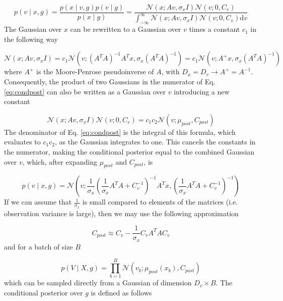\documentclass{paper}
\begin{document}
\begin{equation} \label{eq:condpost}
p(v \mid x,g) = \frac{p(x \mid v,g) p(v \mid g)}{p(x \mid g)} = \frac{\mathcal{N}(x;Av,\sigma_x I) \mathcal{N}(v;0,C_v)}{\int_{-\infty}^{\infty} \mathcal{N}(x;Av,\sigma_x I) \mathcal{N}(v;0,C_v) \mathrm{d}v}
\end{equation}
%
The Gaussian over $x$ can be rewritten to a Gaussian over $v$ times a constant $c_1$ in the following way

\begin{equation} \label{eq:gauss_rewrite1}
\mathcal{N}(x;Av,\sigma_x I) = c_1 \mathcal{N}(v; (A^T A)^{-1} A^T x, \sigma_x (A^T A)^{-1}) = c_1 \mathcal{N}(v; A^{+} x, \sigma_x (A^T A)^{-1})
\end{equation}
%
where $A^{+}$ is the Moore-Penrose pseudoinverse of $A$, with $D_x = D_v \rightarrow A^{+} = A^{-1}$. Consequently, the product of two Gaussians in the numerator of Eq. \ref{eq:condpost} can also be written as a Gaussian over $v$ introducing a new constant

\begin{equation} \label{eq:gauss_rewrite2}
\mathcal{N}(x;Av,\sigma_x I) \mathcal{N}(v;0,C_v) = c_1 c_2 \mathcal{N}(v; \mu_{post},C_{post})
\end{equation}
%
The denominator of Eq. \ref{eq:condpost} is the integral of this formula, which evaluates to $c_1c_2$, as the Gaussian integrates to one. This cancels the constants in the numerator, making the conditional posterior equal to the combined Gaussian over $v$, which, after expanding $\mu_{post}$ and $C_{post}$, is

\begin{equation}
p(v \mid x,g) = \mathcal{N}\left(v; \frac{1}{\sigma_x} \left(\frac{1}{\sigma_x} A^T A + C_v^{-1}\right)^{-1} A^T x, \left(\frac{1}{\sigma_x} A^T A + C_v^{-1}\right)^{-1}\right)
\end{equation}
%
If we can assume that $\frac{1}{\sigma_x}$ is small compared to elements of the matrices (i.e. observation variance is large), then we may use the following approximation

\begin{equation}
C_{post} \approx C_v - \frac{1}{\sigma_x}C_v A^T A C_v
\end{equation}
%
and for a batch of size $B$

\begin{equation}
p(V \mid X,g) = \prod_{b=1}^B \mathcal{N} \left(v_b; \mu_{post}(x_b),C_{post} \right)
\end{equation}
%
which can be sampled directly from a Gaussian of dimension $D_v \times B$. The conditional posterior over $g$ is defined as follows
\end{document}
